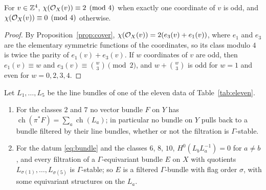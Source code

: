 \begin{lemma}\label{lem:indexmod4}
For $v\in\mathbb{Z}^4$, $\chi(\mathcal{O}_X(v))\equiv2\pmod 4$ when exactly one
coordinate of $v$ is odd, and $\chi(\mathcal{O}_X(v))\equiv0\pmod4$ otherwise.
\end{lemma}
\begin{proof}
By Proposition~\ref{prop:cover}, $\chi(\mathcal{O}_X(v))=2(e_3(v)+e_1(v))$, where
$e_1$ and $e_3$ are the elementary symmetric functions of the coordinates,
so its class modulo $4$ is twice the parity of $e_1(v)+e_3(v)$. If $w$
coordinates of $v$ are odd, then $e_1(v)\equiv w$ and
$e_3(v)\equiv\binom w3\pmod2$, and $w+\binom w3$ is odd for $w=1$ and
even for $w=0,2,3,4$.
\end{proof}

\begin{proposition}\label{prop:nonequivariant}
Let $L_1,\dots,L_5$ be the line bundles of one of the eleven data of
Table~\ref{tab:eleven}.
\begin{enumerate}[label=\textup{(\roman*)},leftmargin=*,itemsep=1pt]
\item For the classes $2$ and $7$ no vector bundle $F$ on $Y$ has
$\operatorname{ch}(\pi^*F)=\sum_a\operatorname{ch}(L_a)$; in particular
no bundle on $Y$ pulls back to a bundle filtered by their line bundles,
whether or not the filtration is $\Gamma$-stable.
\item For the datum \eqref{eq:bundle} and the classes $6$, $8$, $10$,
$H^0(L_bL_a^{-1})=0$ for $a\ne b$, and every filtration of a
$\Gamma$-equivariant bundle $E$ on $X$ with quotients
$L_{\sigma(1)},\dots,L_{\sigma(5)}$ is $\Gamma$-stable; so $E$ is a
filtered $\Gamma$-bundle with flag order $\sigma$, with some equivariant
structures on the $L_a$.
\end{enumerate}
\end{proposition}
